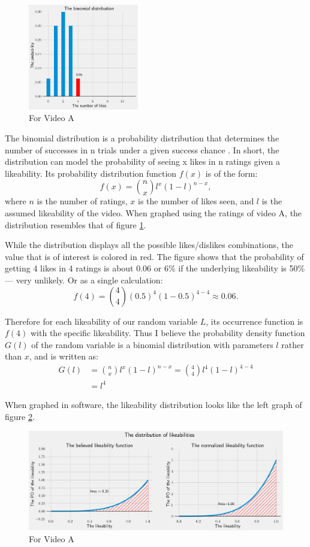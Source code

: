 \documentclass[a4paper,11pt]{article}
\begin{document}
\begin{figure}
    \includegraphics[width=0.43\textwidth,right]{assets/bino_pdfs.png}
    \caption{For Video A}
    \label{fig:bino}
\end{figure}

The binomial distribution is a probability distribution that determines the number of successes in n trials under a given success chance \parencite{barone_2021}. In short, the distribution can model the probability of seeing x likes in n ratings given a likeability. Its probability distribution function $f(x)$ is of the form:
\[
    f(x) = {n \choose x} l^x (1-l)^{n-x},
\]
where $n$ is the number of ratings, $x$ is the number of likes seen, and $l$ is the assumed likeability of the video. When graphed using the ratings of video A, the distribution resembles that of figure \ref{fig:bino}.

While the distribution displays all the possible likes/dislikes combinations, the value that is of interest is colored in red. The figure shows that the probability of getting 4 likes in 4 ratings is about 0.06 or 6\% if the underlying likeability is 50\% --- very unlikely. Or as a single calculation:
\[
    f(4) = {4 \choose 4} (0.5)^4 (1-0.5)^{4-4} \approx 0.06.
\]

Therefore for each likeability of our random variable $L$, its occurrence function is $f(4)$ with the specific likeability. Thus I believe the probability density function $G(l)$ of the random variable is a binomial distribution with parameters $l$ rather than $x$, and is written as:
\begin{align*}
    G(l) &= {n \choose x} l^x (1-l)^{n-x} = {4 \choose 4} l^4 (1-l) ^{4-4}\\
    &= l^4
\end{align*}

When graphed in software, the likeability distribution looks like the left graph of figure \ref{fig:beta}.

\begin{figure}[H]
    \centering
    \includegraphics[width=1\textwidth]{assets/beta_pdfs.png}
    \caption{For Video A}
    \label{fig:beta}
\end{figure}
\end{document}
